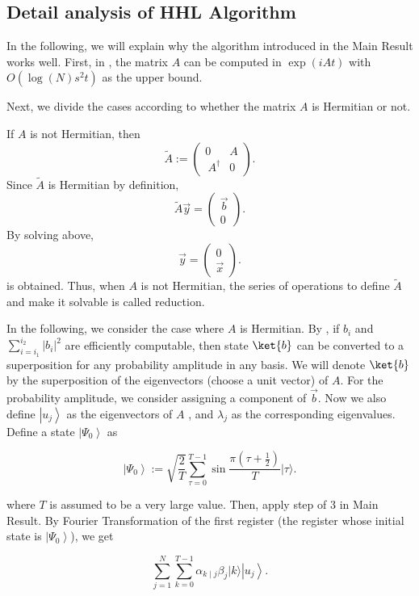 \documentclass[b5paper,papersize,dvipdfmx,fleqn]{article}
\begin{document}
\subsection{Detail analysis of HHL Algorithm}

In the following, we will explain why the algorithm introduced in the Main Result works well. First, in \cite{Berry2007}, the matrix $A$ can be computed in $\exp(iAt)$ with $O(\log(N)s^2t)$ as the upper bound.

Next, we divide the cases according to whether the matrix $A$ is Hermitian or not.

If $A$ is not Hermitian, then
$$
  \tilde{A}:= \left(\begin{array}{cc}
0 & A \\\
A^{\dagger} & 0
\end{array}\right).
$$
Since $\tilde{A}$ is Hermitian by definition,
$$
\tilde{A} \vec{y}=\left(\begin{array}{l}
\vec{b}\\
0
\end{array}\right) .
$$
By solving above,
$$
\vec{y}=\left(\begin{array}{l}
0 \\
\vec{x}
\end{array}\right) .
$$
is obtained. Thus, when $A$ is not Hermitian, the series of operations to define $\tilde{A}$ and make it solvable is called reduction.

In the following, we consider the case where $A$ is Hermitian. By \cite{Grover2002}, if $b_{i}$ and $\sum_{i=i_{1}}^{i_{2}}\left|b_{i}\right|^{2}$ are efficiently computable, then state $\ket{b}$ can be converted to a superposition for any probability amplitude in any basis. We will denote $\ket{b}$ by the superposition of the eigenvectors (choose a unit vector) of $A$. For the probability amplitude, we consider assigning a component of $\vec{b}$. Now we also define $\left|u_{j}\right\rangle$ as the eigenvectors of $A$ , and $\lambda_{j}$ as the corresponding eigenvalues. Define a state $
\left|\Psi_{0}\right\rangle$ as

$$
\left|\Psi_{0}\right\rangle:=\sqrt{\frac{2}{T}}\sum_{\tau=0}^{T-1}\sin \frac{\pi\left(\tau+\frac{1}{2}\right)}{T}|\tau\rangle
.$$

where $T$ is assumed to be a very large value. Then, apply step of 3 in Main Result. By Fourier Transformation of the first register (the register whose initial state is $\left|\Psi_{0}\right\rangle$), we get

$$
\sum_{j=1}^{N} \sum_{k=0}^{T-1} \alpha_{k \mid j} \beta_{j}|k\rangle\left|u_{j}\right\rangle.
$$
\end{document}
